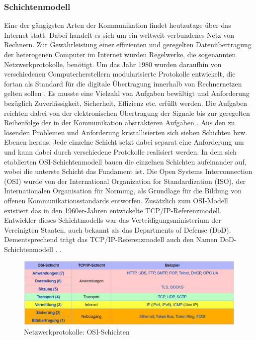 \subsubsection{Schichtenmodell}

Eine der gängigsten Arten der Kommunikation findet heutzutage über das Internet statt. 
Dabei handelt es sich um ein weltweit verbundenes Netz von Rechnern. Zur Gewährleistung einer effizienten und geregelten Datenübertragung der heterogenen Computer im Internet wurden Regelwerke, die sogenannten Netzwerkprotokolle, benötigt.
Um das Jahr 1980 wurden daraufhin von verschiedenen Computerherstellern modularisierte Protokolle entwickelt, die fortan als Standard für die digitale Übertragung innerhalb von Rechnernetzen gelten sollen \cite{wikiNetzwerkprotokolle}.
Es musste eine Vielzahl von Aufgaben bewältigt und Anforderung bezüglich Zuverlässigkeit, Sicherheit, Effizienz etc. erfüllt werden. Die Aufgaben reichten dabei von der elektronischen Übertragung der Signale bis zur geregelten Reihenfolge der in der Kommunikation abstrakteren Aufgaben \cite{wikiOsiModell}. 
Aus den zu lösenden Problemen und Anforderung kristallisierten sich sieben Schichten bzw. Ebenen heraus. 
Jede einzelne Schicht setzt dabei separat eine Anforderung um und kann dabei durch verschiedene Protokolle realisiert werden. In dem sich etablierten OSI-Schichtenmodell bauen die einzelnen Schichten aufeinander auf, wobei die unterste Schicht das Fundament ist. 
Die Open Systems Interconnection (OSI) wurde von der International Organization for Standardization (ISO), der Internationalen Organisation für Normung, als Grundlage für die Bildung von offenen Kommunikationsstandards entworfen. 
\newline
\noindent
Zusätzlich zum OSI-Modell existiert das in den 1960er-Jahren entwickelte TCP/IP-Referenz\-modell. Entwickler dieses Schichtmodells war das Verteidigungsministerium der Vereinigten Staaten, auch bekannt als das Departments of Defense (DoD). Dementsprechend trägt das TCP/IP-Referenzmodell auch den Namen DoD-Schichtenmodell \cite{wikiDodModell}. . 

\begin{figure}[h]
\centering
\includegraphics[width=\textwidth]{images/Netzwerkprotokolle_OSI-Schicht.PNG}
\caption{Netzwerkprotokolle: OSI-Schichten \protect \footnotemark}
\end{figure}

